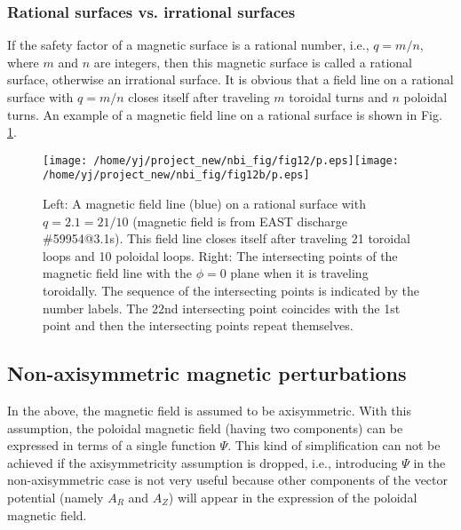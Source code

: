 \documentclass{article}
\begin{document}
\subsubsection{Rational surfaces vs. irrational surfaces}

If the safety factor of a magnetic surface is a rational number, i.e., $q = m
/ n$, where $m$ and $n$ are integers, then this magnetic surface is called a
rational surface, otherwise an irrational surface. It is obvious that a field
line on a rational surface with $q = m / n$ closes itself after traveling $m$
toroidal turns and $n$ poloidal turns. An example of a magnetic field line on
a rational surface is shown in Fig. \ref{17-1-1-1}.

\begin{figure}[h]
  \texttt{[image: /home/yj/project\_new/nbi\_fig/fig12/p.eps]}\texttt{[image: /home/yj/project\_new/nbi\_fig/fig12b/p.eps]}
  \caption{\label{17-1-1-1}Left: A magnetic field line (blue) on a rational
  surface with $q = 2.1 = 21 / 10$ (magnetic field is from EAST discharge
  \#59954@3.1s). This field line closes itself after traveling 21 toroidal
  loops and 10 poloidal loops. Right: The intersecting points of the magnetic
  field line with the $\phi = 0$ plane when it is traveling toroidally. The
  sequence of the intersecting points is indicated by the number labels. The
  22nd intersecting point coincides with the 1st point and then the
  intersecting points repeat themselves.}
\end{figure}

\subsection{Non-axisymmetric magnetic perturbations}

In the above, the magnetic field is assumed to be axisymmetric. With this
assumption, the poloidal magnetic field (having two components) can be
expressed in terms of a single function $\Psi$. This kind of simplification
can not be achieved if the axisymmetricity assumption is dropped, i.e.,
introducing $\Psi$ in the non-axisymmetric case is not very useful because
other components of the vector potential (namely $A_R$ and $A_Z$) will appear
in the expression of the poloidal magnetic field.
\end{document}
